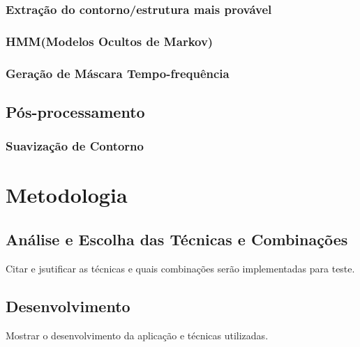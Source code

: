 \documentclass[
	12pt,				%
	openright,			%
	oneside,			%
	a4paper,			%
	english,			%
	brazil,				%
	]{abntex2}
\begin{document}
\subsection{Extração do contorno/estrutura mais provável}

\subsection{HMM(Modelos Ocultos de Markov)}

\subsection{Geração de Máscara Tempo-frequência}

\section{Pós-processamento}
\subsection{Suavização de Contorno}

\chapter[Metodologia]{Metodologia}

\section{Análise e Escolha das Técnicas e Combinações}
Citar e jsutificar as técnicas e quais combinações serão implementadas para teste.

\section{Desenvolvimento}
Mostrar o desenvolvimento da aplicação e técnicas utilizadas.

\end{document}
